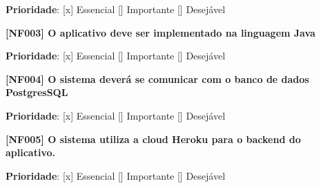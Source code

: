 \textbf{Prioridade}:      [x] Essencial        [] Importante     [] Desejável 

\textbf{[NF003] O aplicativo deve ser implementado na linguagem Java}


\textbf{Prioridade}:      [x] Essencial        [] Importante     [] Desejável 





\textbf{[NF004] O sistema deverá se comunicar com o banco de dados PostgresSQL}

\textbf{Prioridade}:      [x] Essencial        [] Importante     [] Desejável 

\textbf{[NF005] O sistema utiliza a cloud Heroku para o backend do aplicativo.}

\textbf{Prioridade}:      [x] Essencial        [] Importante     [] Desejável 


